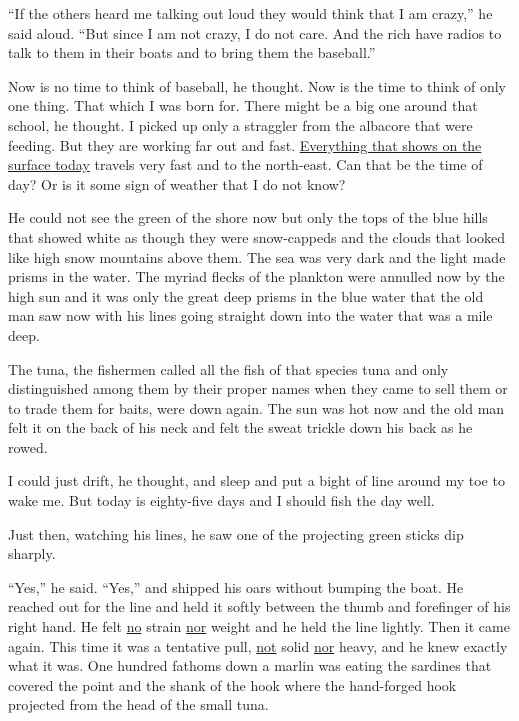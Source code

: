 \documentclass[fontset=ubuntu]{ctexrep}
\begin{document}
``If the others heard me talking out loud they would think that I am
crazy,'' he said aloud. ``But since I am not crazy, I do not care. And the
rich have radios to talk to them in their boats and to bring them the
baseball.''

Now is no time to think of baseball, he thought. Now is the time to think of
only one thing. That which I was born for. There might be a big one around
that school, he thought. I picked up only a \gls{straggler} from the
albacore that were feeding. But they are working far out and fast.
\uline{Everything that shows on the surface today} travels very fast and to the
north-east. Can that be the time of day? Or is it some \gls{sign} of weather that
I do not know?

He could not see the green of the shore now but only the tops of the blue
hills that showed white as though they were snow-\glspl{capped} and the
clouds that looked like high snow mountains above them. The sea was very
dark and the light made \glspl{prism} in the water. The \gls{myriad}
\glspl{fleck} of the plankton were \gls{annulled} now by the high sun and it
was only the great deep prisms in the blue water that the old man saw now
with his lines going straight down into the water that was a mile deep.

The tuna, the fishermen called all the fish of that \gls{species} tuna and
only \gls{distinguished} \gls{among} them by their proper names when they
came to sell them or to trade them for baits, were down again. The sun was
hot now and the old man felt it on the back of his neck and felt the \gls{sweat}
\gls{trickle} down his back as he rowed.

I could just drift, he thought, and sleep and put a \gls{bight} of line
around my \gls{toe} to wake me. But today is eighty-five days and I should
fish the day well.

Just then, watching his lines, he saw one of the projecting green
sticks dip sharply.

``Yes,'' he said. ``Yes,'' and shipped his oars without \gls{bumping} the
boat. He reached out for the line and held it softly between the \gls{thumb}
and \gls{forefinger} of his right hand. He felt \uline{no} \gls{strain}
\uline{nor} weight and he held the line lightly. Then it came again. This
time it was a \gls{tentative} pull, \uline{not} \gls{solid} \uline{nor}
heavy, and he knew exactly what it was. One hundred fathoms down a marlin
was eating the sardines that covered the point and the shank of the hook
where the hand-\gls{forged} hook projected from the head of the small tuna.
\end{document}
